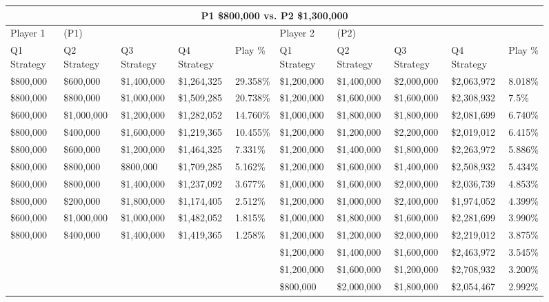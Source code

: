 \documentclass[11pt]{article}
\begin{document}
\begin{figure}
\tiny
\begin{tabular}{ |p{1.0cm}p{1.0cm}p{1.0cm}p{2.0cm}|p{1.0cm}||p{1.0cm}p{1.0cm}p{1.0cm}p{2.0cm}|p{1.0cm}|}
\hline
\multicolumn{10}{|c|}{P1 \$800,000 vs. P2 \$1,300,000} \\
\hline
Player 1 & (P1) & & & & Player 2 & (P2) & & & \\
\hline
Q1 Strategy & Q2 Strategy & Q3 Strategy & Q4 Strategy  &  Play \% & Q1 Strategy & Q2 Strategy & Q3 Strategy & Q4 Strategy  &  Play \%\\
\hline
\$800,000 & \$600,000 & \$1,400,000 & \$1,264,325 & 29.358\% & \$1,200,000 & \$1,400,000 & \$2,000,000 & \$2,063,972 & 8.018\% \\
\$800,000 & \$800,000 & \$1,000,000 & \$1,509,285 & 20.738\% & \$1,200,000 & \$1,600,000 & \$1,600,000 & \$2,308,932 & 7.5\% \\
\$600,000 & \$1,000,000 & \$1,200,000 & \$1,282,052 & 14.760\% & \$1,000,000 & \$1,800,000 & \$1,800,000 & \$2,081,699 & 6.740\% \\
\$800,000 & \$400,000 & \$1,600,000 & \$1,219,365 & 10.455\% & \$1,200,000 & \$1,200,000 & \$2,200,000 & \$2,019,012 & 6.415\% \\
\$800,000 & \$600,000 & \$1,200,000 & \$1,464,325 & 7.331\% & \$1,200,000 & \$1,400,000 & \$1,800,000 & \$2,263,972 & 5.886\% \\
\$800,000 & \$800,000 & \$800,000 & \$1,709,285 & 5.162\% & \$1,200,000 & \$1,600,000 & \$1,400,000 & \$2,508,932 & 5.434\% \\
\$600,000 & \$800,000 & \$1,400,000 & \$1,237,092 & 3.677\% & \$1,000,000 & \$1,600,000 & \$2,000,000 & \$2,036,739 & 4.853\% \\
\$800,000 & \$200,000 & \$1,800,000 & \$1,174,405 & 2.512\% & \$1,200,000 & \$1,000,000 & \$2,400,000 & \$1,974,052 & 4.399\% \\
\$600,000 & \$1,000,000 & \$1,000,000 & \$1,482,052 & 1.815\% & \$1,000,000 & \$1,800,000 & \$1,600,000 & \$2,281,699 & 3.990\% \\
\$800,000 & \$400,000 & \$1,400,000 & \$1,419,365 & 1.258\% & \$1,200,000 & \$1,200,000 & \$2,000,000 & \$2,219,012 & 3.875\% \\
& & & & & \$1,200,000 & \$1,400,000 & \$1,600,000 & \$2,463,972 & 3.545\% \\
& & & & & \$1,200,000 & \$1,600,000 & \$1,200,000 & \$2,708,932 & 3.200\% \\
& & & & & \$800,000 & \$2,000,000 & \$1,800,000 & \$2,054,467 & 2.992\% \\

\end{tabular}
\end{figure}
\end{document}
